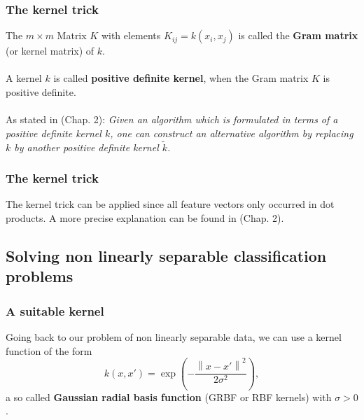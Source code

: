 \documentclass{beamer}
\begin{document}
\begin{frame}{}
	\frametitle{The kernel trick}
    The $m \times m$ Matrix $K$ with elements $K_{ij} = k(x_i, x_j)$ is called the \textbf{Gram matrix} (or kernel matrix) of $k$. \\~\\
    A kernel $k$ is called \textbf{positive definite kernel}, when the Gram matrix $K$ is positive definite. \\~\\
	As stated in \cite{Schoelkopf}(Chap. 2): \textit{Given an algorithm which is formulated in terms of a positive definite kernel $k$, one can construct an alternative algorithm by replacing $k$ by another positive definite kernel $\tilde{k}$.}
\end{frame}


\begin{frame}{}
	\frametitle{The kernel trick}
	The kernel trick can be applied since all feature vectors only occurred in dot products. A more precise explanation can be found in \cite{Schoelkopf}(Chap. 2).
\end{frame}


\subsection{Solving non linearly separable classification problems}

\begin{frame}{}
	\frametitle{A suitable kernel}
	Going back to our problem of non linearly separable data, we can use a kernel function of the form
    \begin{equation}
        k(x, x') = \exp \left( - \frac{\left\lVert x - x' \right\rVert^2}{2 \sigma^2} \right),
    \end{equation}
    a so called \textbf{Gaussian radial basis function} (GRBF or RBF kernels) with $ \sigma > 0$.
\end{frame}
\end{document}
